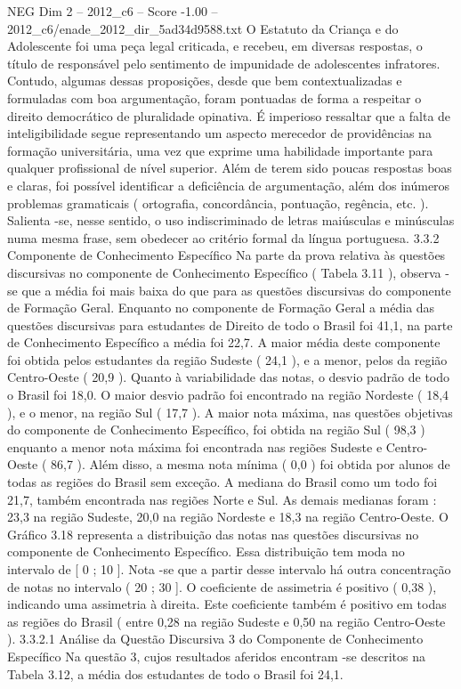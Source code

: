 \begin{textsample}{NEG Dim 2 – 2012\_c6 – Score -1.00 – 2012\_c6/enade\_2012\_dir\_5ad34d9588.txt}
O Estatuto da Criança e do Adolescente foi uma peça legal criticada, e recebeu, em diversas respostas, o título de responsável pelo sentimento de impunidade de adolescentes infratores.
Contudo, algumas dessas proposições, desde que bem contextualizadas e formuladas com boa argumentação, foram pontuadas de forma a respeitar o direito democrático de pluralidade opinativa.
É imperioso ressaltar que a falta de inteligibilidade segue representando um aspecto merecedor de providências na formação universitária, uma vez que exprime uma habilidade importante para qualquer profissional de nível superior.
Além de terem sido poucas respostas boas e claras, foi possível identificar a deficiência de argumentação, além dos inúmeros problemas gramaticais ( ortografia, concordância, pontuação, regência, etc. ).
Salienta -se, nesse sentido, o uso indiscriminado de letras maiúsculas e minúsculas numa mesma frase, sem obedecer ao critério formal da língua portuguesa. 3.3.2 Componente de Conhecimento Específico Na parte da prova relativa às questões discursivas no componente de Conhecimento Específico ( Tabela 3.11 ), observa -se que a média foi mais baixa do que para as questões discursivas do componente de Formação Geral.
Enquanto no componente de Formação Geral a média das questões discursivas para estudantes de Direito de todo o Brasil foi 41,1, na parte de Conhecimento Específico a média foi 22,7.
A maior média deste componente foi obtida pelos estudantes da região Sudeste ( 24,1 ), e a menor, pelos da região Centro-Oeste ( 20,9 ).
Quanto à variabilidade das notas, o desvio padrão de todo o Brasil foi 18,0.
O maior desvio padrão foi encontrado na região Nordeste ( 18,4 ), e o menor, na região Sul ( 17,7 ).
A maior nota máxima, nas questões objetivas do componente de Conhecimento Específico, foi obtida na região Sul ( 98,3 ) enquanto a menor nota máxima foi encontrada nas regiões Sudeste e Centro-Oeste ( 86,7 ).
Além disso, a mesma nota mínima ( 0,0 ) foi obtida por alunos de todas as regiões do Brasil sem exceção.
A mediana do Brasil como um todo foi 21,7, também encontrada nas regiões Norte e Sul.
As demais medianas foram : 23,3 na região Sudeste, 20,0 na região Nordeste e 18,3 na região Centro-Oeste.
O Gráfico 3.18 representa a distribuição das notas nas questões discursivas no componente de Conhecimento Específico.
Essa distribuição tem moda no intervalo de [ 0 ; 10 ].
Nota -se que a partir desse intervalo há outra concentração de notas no intervalo ( 20 ; 30 ].
O coeficiente de assimetria é positivo ( 0,38 ), indicando uma assimetria à direita.
Este coeficiente também é positivo em todas as regiões do Brasil ( entre 0,28 na região Sudeste e 0,50 na região Centro-Oeste ). 3.3.2.1 Análise da Questão Discursiva 3 do Componente de Conhecimento Específico Na questão 3, cujos resultados aferidos encontram -se descritos na Tabela 3.12, a média dos estudantes de todo o Brasil foi 24,1.

\end{textsample}

